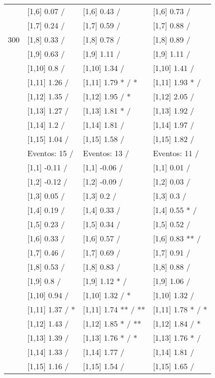 \begin{table}
\begin{tabular}[t]{llll}
 & {}[1,6] 0.07  / & {}[1,6] 0.43  / & {}[1,6] 0.73  /\\
 & {}[1,7] 0.24  / & {}[1,7] 0.59  / & {}[1,7] 0.88  /\\
300 & {}[1,8] 0.33  / & {}[1,8] 0.78  / & {}[1,8] 0.89  /\\
\addlinespace
 & {}[1,9] 0.63  / & {}[1,9] 1.11  / & {}[1,9] 1.11  /\\
 & {}[1,10] 0.8  / & {}[1,10] 1.34  / & {}[1,10] 1.41  /\\
 & {}[1,11] 1.26  / & {}[1,11] 1.79 * / * & {}[1,11] 1.93 * /\\
 & {}[1,12] 1.35  / & {}[1,12] 1.95  / * & {}[1,12] 2.05  /\\
 & {}[1,13] 1.27  / & {}[1,13] 1.81 * / & {}[1,13] 1.92  /\\
\addlinespace
 & {}[1,14] 1.2  / & {}[1,14] 1.81  / & {}[1,14] 1.97  /\\
 & {}[1,15] 1.04  / & {}[1,15] 1.58  / & {}[1,15] 1.82  /\\
 & Eventos:  15 / & Eventos:  13 / & Eventos:  11 /\\
 & {}[1,1] -0.11  / & {}[1,1] -0.06  / & {}[1,1] 0.01  /\\
 & {}[1,2] -0.12  / & {}[1,2] -0.09  / & {}[1,2] 0.03  /\\
\addlinespace
 & {}[1,3] 0.05  / & {}[1,3] 0.2  / & {}[1,3] 0.3  /\\
 & {}[1,4] 0.19  / & {}[1,4] 0.33  / & {}[1,4] 0.55 * /\\
 & {}[1,5] 0.23  / & {}[1,5] 0.34  / & {}[1,5] 0.52  /\\
 & {}[1,6] 0.33  / & {}[1,6] 0.57  / & {}[1,6] 0.83 ** /\\
 & {}[1,7] 0.46  / & {}[1,7] 0.69  / & {}[1,7] 0.91  /\\
\addlinespace
500 & {}[1,8] 0.53  / & {}[1,8] 0.83  / & {}[1,8] 0.88  /\\
 & {}[1,9] 0.8  / & {}[1,9] 1.12 * / & {}[1,9] 1.06  /\\
 & {}[1,10] 0.94  / & {}[1,10] 1.32  / * & {}[1,10] 1.32  /\\
 & {}[1,11] 1.37  / * & {}[1,11] 1.74 ** / ** & {}[1,11] 1.78 * / *\\
 & {}[1,12] 1.43  / & {}[1,12] 1.85 * / ** & {}[1,12] 1.84  / *\\
\addlinespace
 & {}[1,13] 1.39  / & {}[1,13] 1.76 * / * & {}[1,13] 1.76 * /\\
 & {}[1,14] 1.33  / & {}[1,14] 1.77  / & {}[1,14] 1.81  /\\
 & {}[1,15] 1.16  / & {}[1,15] 1.54  / & {}[1,15] 1.65  /\\
\bottomrule
\end{tabular}
\end{table}
